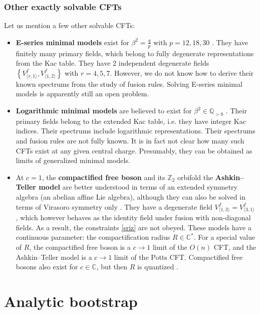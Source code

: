 \documentclass[12pt, a4paper]{article}
\newcommand{\myindex}[1]{\textbf{\boldmath #1}}
\theoremstyle{break}
\begin{document}
\subsubsection{Other exactly solvable CFTs}

Let us mention a few other solvable CFTs:
\begin{itemize}
 \item \myindex{E-series minimal models} exist for $\beta^2=\frac{q}{p}$ with $p=12, 18, 30$ \cite{fms97}. They have finitely many primary fields, which belong to fully degenerate representations from the Kac table. 
They have 2 independent degenerate fields $\left\{V^f_{\langle r,1\rangle},V^f_{\langle 1,2\rangle}\right\}$ with $r=4,5,7$. 
However, we do not know how to derive their known spectrums from the study of fusion rules. 
Solving E-series minimal models is apparently still an open problem. 
\item \myindex{Logarithmic minimal models} are believed to exist for $\beta^2\in \mathbb{Q}_{>0}$ \cite{prz06}. Their primary fields belong to the extended Kac table, i.e. they have integer Kac indices. Their spectrums include logarithmic representations. Their spectrums and fusion rules are not fully known. It is in fact not clear how many such CFTs exist at any given central charge. Presumably, they can be obtained as limits of generalized minimal models. 
\item At $c=1$, the \myindex{compactified free boson} and its $\mathbb{Z}_2$ orbifold the \myindex{Ashkin--Teller model} are better understood in terms of an extended symmetry algebra (an abelian affine Lie algebra), although they can also be solved in terms of Virasoro symmetry only \cite{nr21}. They have a degenerate field $V^f_{\langle 1, 3\rangle}=V^f_{\langle 3,1\rangle}$, which however behaves as the identity field under fusion with non-diagonal fields. As a result, the constraints \eqref{sriz} are not obeyed. These models have a continuous parameter: the compactification radius $R\in\mathbb{C}^*$. For a special value of $R$, the compactified free boson is a $c\to 1$ limit of the $O(n)$ CFT, and the Ashkin--Teller model is a $c\to 1$ limit of the Potts CFT. Compactified free bosons also exist for $c\in\mathbb{C}$, but then $R$ is quantized \cite{rib14}. 
\end{itemize}


\section{Analytic bootstrap}\label{sec:ab}
\end{document}
